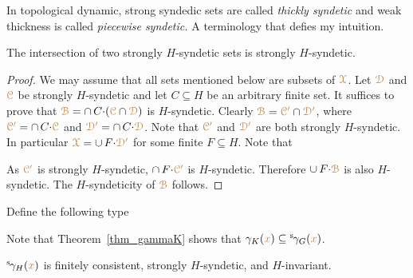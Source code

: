 \noindent\llap{\textcolor{red}{\Large\warning}\kern1.5ex}\ignorespaces
In topological dynamic, strong syndedic sets are called \textit{thickly syndetic\/} and weak thickness is called \textit{piecewise syndetic.}
A terminology that defies my intuition.

\begin{lemma}\label{lem_strongly_syndetic}
  The intersection of two strongly $H$-syndetic sets is strongly $H$-syndetic.
\end{lemma}

\begin{proof}
  We may assume that all sets mentioned below are subsets of ${\color{brown}\EuScript X}$.
  Let ${\color{brown}\EuScript D}$ and ${\color{brown}\EuScript C}$ be strongly $H$-syndetic and let $C\subseteq H$ be an arbitrary finite set.
  It suffices to prove that ${\color{brown}\EuScript B}=\cap\, C{\cdot}({\color{brown}\EuScript C}\cap{\color{brown}\EuScript D})$ is $H$-syndetic. 
  Clearly ${\color{brown}\EuScript B}={\color{brown}\EuScript C'}\cap{\color{brown}\EuScript D'}$, where ${\color{brown}\EuScript C'}=\cap\, C{\cdot}{\color{brown}\EuScript C}$ and ${\color{brown}\EuScript D'}=\cap\, C{\cdot}{\color{brown}\EuScript D}$.
  Note that ${\color{brown}\EuScript C'}$ and ${\color{brown}\EuScript D'}$ are both strongly $H$-syndetic.
  In particular ${\color{brown}\EuScript X}=\cup\,F{\cdot}\color{brown}\EuScript D'$ for some finite $F\subseteq H$.
  Note that
  

  
  
  
  As ${\color{brown}\EuScript C'}$ is strongly $H$-syndetic, $\cap\, F{\cdot}{\color{brown}\EuScript C'}$ is $H$-syndetic.
  Therefore $\cup\,F{\cdot}{\color{brown}\EuScript B}$ is also $H$-syndetic.
  The $H$-syndeticity of ${\color{brown}\EuScript B}$ follows.
\end{proof}

Define the following type

\smallskip

Note that Theorem~\ref{thm_gammaK} shows that $\gamma_K({\color{brown} x})\subseteq{}^{\rm s}\kern-.2ex\gamma_G({\color{brown} x})$.

\begin{corollary}\label{corol_str_gen}
  ${}^{\rm s}\kern-.2ex\gamma_H({\color{brown} x})$ is finitely consistent, strongly $H$-syndetic, and $H$-invariant.
\end{corollary}

